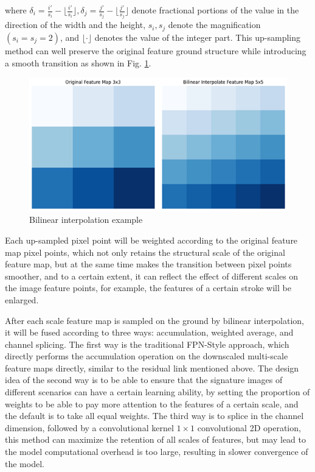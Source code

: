 where $\delta_i=\frac{i'}{s_i} - \lfloor \frac{i'}{s_i} \rfloor, \delta_j = \frac{j'}{s_j} - \lfloor \frac{j'}{s_j} \rfloor$ denote fractional portions of the value in the direction of the width and the height, $s_i,s_j$ denote the magnification $(s_i = s_j = 2)$, and $\lfloor \cdot \rfloor$ denotes the value of the integer part. This up-sampling method can well preserve the original feature ground structure while introducing a smooth transition as shown in Fig. \ref{fig:bilinear}. 

\begin{figure}[htbp]
  \centering
  \includegraphics[scale=0.9]{figure/bilinear.png}
  \caption{Bilinear interpolation example}
  \label{fig:bilinear}
\end{figure}

Each up-sampled pixel point will be weighted according to the original feature map pixel points, which not only retains the structural scale of the original feature map, but at the same time makes the transition between pixel points smoother, and to a certain extent, it can reflect the effect of different scales on the image feature points, for example, the features of a certain stroke will be enlarged.

After each scale feature map is sampled on the ground by bilinear interpolation, it will be fused according to three ways: accumulation, weighted average, and channel splicing. The first way is the traditional FPN-Style approach, which directly performs the accumulation operation on the downscaled multi-scale feature maps directly, similar to the residual link mentioned above. The design idea of the second way is to be able to ensure that the signature images of different scenarios can have a certain learning ability, by setting the proportion of weights to be able to pay more attention to the features of a certain scale, and the default is to take all equal weights. The third way is to splice in the channel dimension, followed by a convolutional kernel $1\times 1$ convolutional 2D operation, this method can maximize the retention of all scales of features, but may lead to the model computational overhead is too large, resulting in slower convergence of the model.

